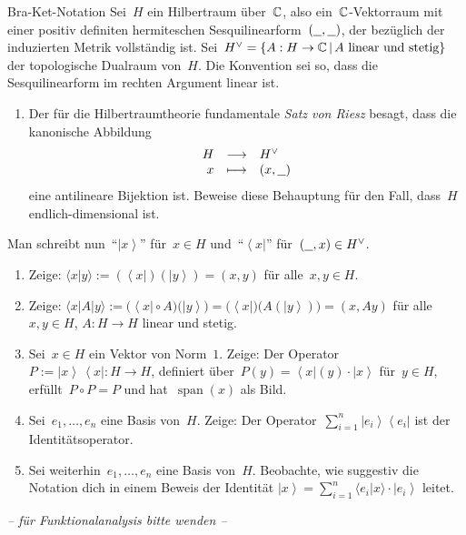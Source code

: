 \documentclass{pizzablatt}
\newcommand{\bra}[1]{\left\langle #1 \right|}
\newcommand{\ket}[1]{\left| #1 \right\rangle}
\begin{document}
\begin{aufgabe}{Bra-Ket-Notation}
Sei~$H$ ein Hilbertraum über~$\mathbb{C}$, also ein~$\mathbb{C}$-Vektorraum mit einer
positiv definiten hermiteschen Sesquilinearform~$(\underline{\ \ },\underline{\ \ })$, der
bezüglich der induzierten Metrik vollständig ist. Sei~$H^\vee =
\{ A : H \to \mathbb{C} \,|\, \text{$A$ linear und stetig} \}$ der topologische
Dualraum von~$H$. Die Konvention sei so, dass die Sesquilinearform im rechten
Argument linear ist.

\begin{enumerate}
\item Der für die Hilbertraumtheorie fundamentale \emph{Satz von Riesz} besagt,
dass die kanonische Abbildung
\[ \begin{array}{@{}rcl@{}}
  H &\longrightarrow& H^\vee \\
  x &\longmapsto& (x, \freist)
\end{array} \]
eine antilineare Bijektion ist. Beweise diese Behauptung für den Fall, dass~$H$
endlich-dimensional ist.
\end{enumerate}

Man schreibt nun~"`$\ket{x}$"' für~$x \in H$ und~"`$\bra{x}$"' für~$(\underline{\ \ },x)
\in H^\vee$.

\begin{enumerate}
\addtocounter{enumi}{1}
\item Zeige: $\langle x|y \rangle := (\bra{x})(\ket{y}) = (x,y)$ für
alle~$x,y \in H$.
\item Zeige: $\langle x|A|y \rangle := \bigl(\bra{x} \circ A\bigr)
\bigl(\ket{y}\bigr) = \bigl(\bra{x}\bigr) \bigl(A(\ket{y})\bigr) = (x,Ay)$ für
alle~$x,y \in H$, $A : H \to H$ linear und stetig.
\item Sei~$x \in H$ ein Vektor von Norm~$1$. Zeige: Der Operator~$P := \ket{x} \, \bra{x} : H \to H$, definiert
über~$P(y) = \bra{x}(y) \cdot \ket{x}$ für~$y \in H$, erfüllt~$P \circ P = P$
und hat~$\operatorname{span}(x)$ als Bild.
\item Sei~$e_1,\ldots,e_n$ eine Basis von~$H$. Zeige: Der
Operator~$\sum_{i=1}^n \ket{e_i} \bra{e_i}$ ist der Identitätsoperator.
\item Sei weiterhin~$e_1,\ldots,e_n$ eine Basis von~$H$. Beobachte, wie
suggestiv die Notation dich in einem Beweis der Identität $\ket{x} =
\sum_{i=1}^n \langle e_i|x \rangle \cdot \ket{e_i}$ leitet.
\end{enumerate}
\end{aufgabe}

\begin{center}\emph{-- für Funktionalanalysis bitte wenden --}\end{center}
\end{document}

